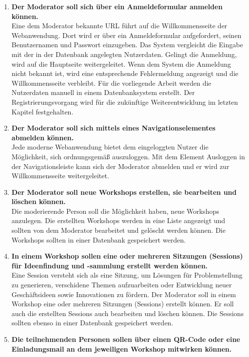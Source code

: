 \begin{enumerate}
\item \textbf{Der Moderator soll sich über ein Anmeldeformular anmelden können.}\\
Eine dem Moderator bekannte URL führt auf die Willkommensseite der Webanwendung. Dort wird er über ein Anmeldeformular aufgefordert, seinen Benutzernamen und Passwort einzugeben. Das System vergleicht die Eingabe mit der in der Datenbank angelegten Nutzerdaten. Gelingt die Anmeldung, wird auf die Hauptseite weitergeleitet. Wenn dem System die Anmeldung nicht bekannt ist, wird eine entsprechende Fehlermeldung angezeigt und die Willkommensseite verbleibt. Für die vorliegende Arbeit werden die Nutzerdaten manuell in einem Datenbanksystem erstellt. Der Registrierungsvorgang wird für die zukünftige Weiterentwicklung im letzten Kapitel festgehalten. 
\item \textbf{Der Moderator soll sich mittels eines Navigationselementes abmelden können.}\\ 
Jede moderne Webanwendung bietet dem eingeloggten Nutzer die Möglichkeit, sich ordnungsgemäß auszuloggen. Mit dem Element \glqq Ausloggen\grqq{} in der Navigationsleiste kann sich der Moderator abmelden und er wird zur Willkommensseite weitergeleitet.
\item \textbf{Der Moderator soll neue Workshops erstellen, sie bearbeiten und löschen können.}\\
Die moderierende Person soll die Möglichkeit haben, neue Workshops anzulegen. Die erstellten Workshops werden in eine Liste angezeigt und sollten von dem Moderator bearbeitet und gelöscht werden können. Die Workshops sollten in einer Datenbank gespeichert werden.
\item \textbf{In einem Workshop sollen eine oder mehreren Sitzungen (Sessions) für Ideenfindung und -sammlung erstellt werden können.}\\
Eine Session versteht sich als eine Sitzung, um Lösungen für Problemstellung zu generieren, verschidene Themen aufzuarbeiten oder Entwicklung neuer Geschäftsideen sowie Innovationen zu fördern. Der Moderator soll in einem Workshop eine oder mehreren Sitzungen (Sessions) erstellt können. Er soll auch die erstellten Sessions auch bearbeiten und löschen können. Die Sessions sollten ebenso in einer Datenbank gespeichert werden.
\item \textbf{Die teilnehmenden Personen sollen über einen QR-Code oder eine Einladungsmail an dem jeweiligen Workshop mitwirken können.}\\

\end{enumerate}
